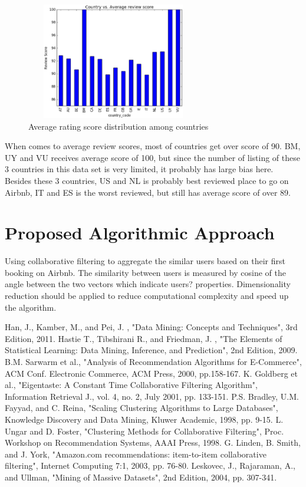 \documentclass{sig-alternate-05-2015}
\begin{document}
\begin{figure}
\centering
\includegraphics[height=2in, width=3in]{country-avgRating}
\caption{Average rating score distribution among countries}
\end{figure}

When comes to average review scores, most of countries get over score of 90. BM, UY and VU receives average score of 100, but since the number of listing of these 3 countries in this data set is very limited, it probably has large bias here. Besides these 3 countries, US and NL is probably best reviewed place to go on Airbnb, IT and ES is the worst reviewed, but still has average score of over 89.

\FloatBarrier
\section{Proposed Algorithmic Approach}
Using collaborative filtering to aggregate the similar users based on their first booking on Airbnb. The similarity between users is measured by cosine of the angle between the two vectors which indicate users? properties. Dimensionality reduction should be applied to reduce computational complexity and speed up the algorithm.

\medskip

\begin{thebibliography}{9}
 Han, J., Kamber, M., and Pei, J. , "Data Mining: Concepts and Techniques", 3rd Edition, 2011.
 Hastie T., Tibshirani R., and Friedman, J. , "The Elements of Statistical Learning: Data Mining, Inference, and Prediction", 2nd Edition, 2009.
 B.M. Sarwarm et al., "Analysis of Recommendation Algorithms for E-Commerce", ACM Conf. Electronic Commerce, ACM Press, 2000, pp.158-167.
 K. Goldberg et al., "Eigentaste: A Constant Time Collaborative Filtering Algorithm", Information Retrieval J., vol. 4, no. 2, July 2001, pp. 133-151.
 P.S. Bradley, U.M. Fayyad, and C. Reina, "Scaling Clustering Algorithms to Large Databases", Knowledge Discovery and Data Mining, Kluwer Academic, 1998, pp. 9-15.
 L. Ungar and D. Foster, "Clustering Methods for Collaborative Filtering", Proc. Workshop on Recommendation Systems, AAAI Press, 1998.
 G. Linden, B. Smith, and J. York, "Amazon.com recommendations: item-to-item collaborative filtering", Internet Computing 7:1, 2003, pp. 76-80.
 Leskovec, J., Rajaraman, A., and Ullman, "Mining of Massive Datasets", 2nd Edition, 2004, pp. 307-341.

\end{thebibliography}
\end{document}
